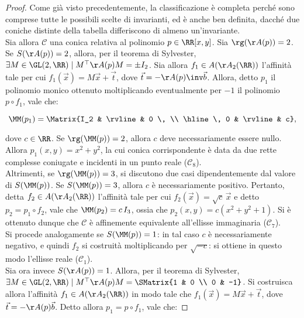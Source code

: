 \documentclass[11pt]{article}
\begin{document}
	\vskip 0.1in

	\begin{proof}
		Come già visto precedentemente, la classificazione è completa perché sono comprese tutte le possibili
		scelte di invarianti, ed è anche ben definita, dacché
		due coniche distinte della tabella differiscono di almeno un'invariante. \\
		
		Sia allora $\mathcal{C}$ una conica relativa al polinomio $p \in \RR[x, y]$. Sia $\rg(\AA(p)) = 2$.
		Se $S(\AA(p)) = 2$, allora, per il teorema di Sylvester, $\exists M \in \GL(2, \RR) \mid M^\top \AA(p) M = \pm I_2$. Sia allora
		$f_1 \in A(\AA_2(\RR))$ l'affinità tale per cui
		$f_1(\vec x) = M \vec x + \vec t$, dove $\vec t = - \AA(p)\inv \vec b$. Allora, detto $p_1$ il polinomio monico ottenuto moltiplicando eventualmente per $-1$ il polinomio $p \circ f_1$, vale che:
		
		\[ \MM(p_1) = \Matrix{I_2 & \rvline & 0 \, \\ \hline \, 0 & \rvline & c}, \]
		
		\vskip 0.05in
		
		dove $c \in \RR$. Se $\rg(\MM(p)) = 2$, allora
		$c$ deve necessariamente essere nullo. Allora
		$p_1(x, y) = x^2 + y^2$, la cui conica corrispondente
		è data da due rette complesse coniugate e incidenti in un punto reale ($\mathcal{C}_8$). \\
		
		Altrimenti, se
		$\rg(\MM(p)) = 3$, si discutono due casi dipendentemente dal valore di $S(\MM(p))$. Se
		$S(\MM(p)) = 3$, allora $c$ è necessariamente positivo. Pertanto, detta $f_2 \in A(\AA_2(\RR))$
		l'affinità tale per cui $f_2(\vec x) = \sqrt{c} \, \vec x$ e detto $p_2 = p_1 \circ f_2$, vale che $\MM(p_2) = c \, I_3$, ossia che $p_2(x, y) = c(x^2 + y^2 + 1)$. Si è ottenuto dunque che $\mathcal{C}$ è affinemente equivalente all'ellisse immaginaria ($\mathcal{C}_7$). \\
		
		Si procede analogamente se $S(\MM(p)) = 1$: in
		tal caso $c$ è necessariamente negativo, e quindi
		$f_2$ si costruità moltiplicando per $\sqrt{-c}$:
		si ottiene in questo modo l'ellisse reale ($\mathcal{C}_1$). \\
		
		Sia ora invece $S(\AA(p)) = 1$. Allora, per il teorema di Sylvester, $\exists M \in \GL(2, \RR) \mid M^\top \AA(p) M = \SMatrix{1 & 0 \\ 0 & -1}$.
		Si costruisca allora l'affinità $f_1 \in A(\AA_2(\RR))$ in modo tale che $f_1(\vec x) = M \vec x + \vec t$, dove $\vec t = -\AA(p) \vec b$.
		Detto allora $p_1 = p \circ f_1$, vale che:
		

\end{proof}
\end{document}
